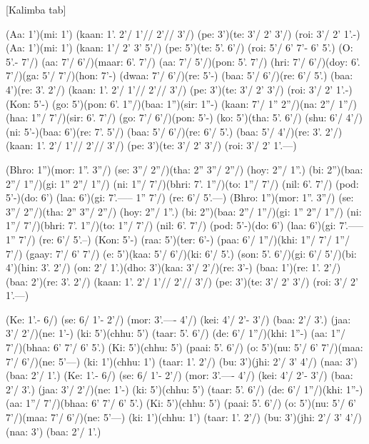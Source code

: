 \documentclass[11pt]{article}
\begin{document}
[Kalimba tab]
\begin{jianpu}
(Aa: 1')(mi: 1') (kaan: 1'. 2'/ 1'// 2'// 3'/) (pe: 3')(te: 3'/ 2' 3'/) (roi: 3'/ 2' 1'.-)
(Aa: 1')(mi: 1') (kaan: 1'/ 2' 3' 5'/) (pe: 5')(te: 5'. 6'/) (roi: 5'/ 6' 7'- 6' 5'.)
(O: 5'.- 7'/) (aa: 7'/ 6'/)(maar: 6'. 7'/) (aa: 7'/ 5'/)(pon: 5'. 7'/) (hri: 7'/ 6'/)(doy: 6'. 7'/)(ga: 5'/ 7'/)(hon: 7'-)
(dwaa: 7'/ 6'/)(re: 5'-) (baa: 5'/ 6'/)(re: 6'/ 5'.) (baa: 4')(re: 3'. 2'/) (kaan: 1'. 2'/ 1'// 2'// 3'/) (pe: 3')(te: 3'/ 2' 3'/) (roi: 3'/ 2' 1'.-)
(Kon: 5'-) (go: 5')(pon: 6'. 1''/)(baa: 1'')(sir: 1''-)
(kaan: 7'/ 1'' 2''/)(na: 2''/ 1''/)(haa: 1''/ 7'/)(sir: 6'. 7'/) (go: 7'/ 6'/)(pon: 5'-) (ko: 5')(tha: 5'. 6'/)
(shu: 6'/ 4'/)(ni: 5'-)(baa: 6')(re: 7'. 5'/) (baa: 5'/ 6'/)(re: 6'/ 5'.)
(baa: 5'/ 4'/)(re: 3'. 2'/) (kaan: 1'. 2'/ 1'// 2'// 3'/) (pe: 3')(te: 3'/ 2' 3'/) (roi: 3'/ 2' 1'.---)

(Bhro: 1'')(mor: 1''. 3''/) (se: 3''/ 2''/)(tha: 2'' 3''/ 2''/) (hoy: 2''/ 1''.) (bi: 2'')(baa: 2''/ 1''/)(gi: 1'' 2''/ 1''/)
(ni: 1''/ 7'/)(bhri: 7'. 1''/)(to: 1''/ 7'/) (nil: 6'. 7'/) (pod: 5'-)(do: 6') (laa: 6')(gi: 7'.----- 1'' 7'/) (re: 6'/ 5'.---)
(Bhro: 1'')(mor: 1''. 3''/) (se: 3''/ 2''/)(tha: 2'' 3''/ 2''/) (hoy: 2''/ 1''.) (bi: 2'')(baa: 2''/ 1''/)(gi: 1'' 2''/ 1''/)
(ni: 1''/ 7'/)(bhri: 7'. 1''/)(to: 1''/ 7'/) (nil: 6'. 7'/) (pod: 5'-)(do: 6') (laa: 6')(gi: 7'.----- 1'' 7'/) (re: 6'/ 5'.--)
(Kon: 5'-) (raa: 5')(ter: 6'-) (paa: 6'/ 1''/)(khi: 1''/ 7'/ 1''/ 7'/) (gaay: 7'/ 6' 7'/)
(e: 5')(kaa: 5'/ 6'/)(ki: 6'/ 5'.) (son: 5'. 6'/)(gi: 6'/ 5'/)(bi: 4')(hin: 3'. 2'/)
(on: 2'/ 1'.)(dho: 3')(kaa: 3'/ 2'/)(re: 3'-) (baa: 1')(re: 1'. 2'/)
(baa: 2')(re: 3'. 2'/) (kaan: 1'. 2'/ 1'// 2'// 3'/) (pe: 3')(te: 3'/ 2' 3'/) (roi: 3'/ 2' 1'.---)

(Ke: 1'.- 6/) (se: 6/ 1'- 2'/) (mor: 3'.---- 4'/) (kei: 4'/ 2'- 3'/) (baa: 2'/ 3'.) (jaa: 3'/ 2'/)(ne: 1'-)
(ki: 5')(chhu: 5') (taar: 5'. 6'/) (de: 6'/ 1''/)(khi: 1''-) (aa: 1''/ 7'/)(bhaa: 6' 7'/ 6' 5'.)
(Ki: 5')(chhu: 5') (paai: 5'. 6'/) (o: 5')(nu: 5'/ 6' 7'/)(maa: 7'/ 6'/)(ne: 5'---)
(ki: 1')(chhu: 1') (taar: 1'. 2'/) (bu: 3')(jhi: 2'/ 3' 4'/) (naa: 3') (baa: 2'/ 1'.)
(Ke: 1'.- 6/) (se: 6/ 1'- 2'/) (mor: 3'.---- 4'/) (kei: 4'/ 2'- 3'/) (baa: 2'/ 3'.) (jaa: 3'/ 2'/)(ne: 1'-)
(ki: 5')(chhu: 5') (taar: 5'. 6'/) (de: 6'/ 1''/)(khi: 1''-) (aa: 1''/ 7'/)(bhaa: 6' 7'/ 6' 5'.)
(Ki: 5')(chhu: 5') (paai: 5'. 6'/) (o: 5')(nu: 5'/ 6' 7'/)(maa: 7'/ 6'/)(ne: 5'---)
(ki: 1')(chhu: 1') (taar: 1'. 2'/) (bu: 3')(jhi: 2'/ 3' 4'/) (naa: 3') (baa: 2'/ 1'.)


\end{jianpu}
\end{document}
